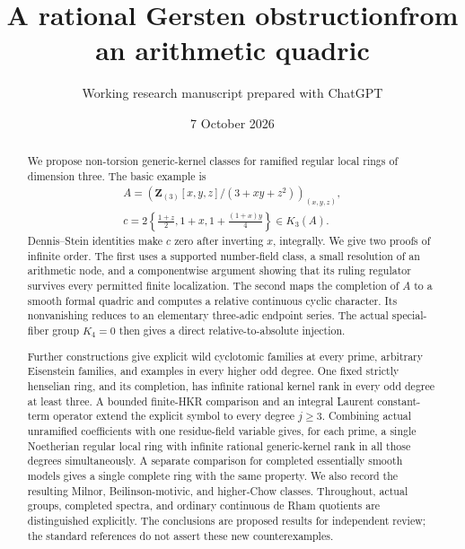 \documentclass[11pt,a4paper]{article}
\title{\textbf{A rational Gersten obstruction\newline from an arithmetic quadric}}
\author{Working research manuscript prepared with ChatGPT}
\date{7 October 2026}
\theoremstyle{remark}
\newcommand{\Z}{\mathbf Z}
\begin{document}
\maketitle
\thispagestyle{empty}

\begin{center}
\end{center}

\begin{abstract}
We propose non-torsion generic-kernel classes for ramified regular
local rings of dimension three. The basic example is
\[
 \begin{gathered}
 A=\left(\Z_{(3)}[x,y,z]/(3+xy+z^2)\right)_{(x,y,z)},\\
 c=2\left\{\frac{1+z}{2},1+x,1+\frac{(1+x)y}{4}\right\}\in K_3(A).
 \end{gathered}
\]
Dennis--Stein identities make $c$ zero after inverting $x$, integrally.
We give two proofs of infinite order. The first uses a supported
number-field class, a small resolution of an arithmetic node,
and a componentwise argument showing that its ruling regulator
survives every permitted finite localization. The second maps the
completion of $A$ to a smooth formal quadric and computes a relative
continuous cyclic character. Its nonvanishing reduces to an elementary
three-adic endpoint series. The actual special-fiber group $K_4=0$
then gives a direct relative-to-absolute injection.

Further constructions give explicit wild cyclotomic families at every
prime, arbitrary Eisenstein families, and examples in every higher odd
degree. One fixed strictly henselian ring, and its completion, has
infinite rational kernel rank in every odd degree at least three.
A bounded finite-HKR comparison and an integral Laurent constant-term
operator extend the explicit symbol to every degree $j\geq3$.
Combining actual unramified coefficients with one residue-field variable
gives, for each prime, a single Noetherian regular local ring with
infinite rational generic-kernel rank in all those degrees simultaneously.
A separate comparison for completed essentially smooth models gives
a single complete ring with the same property.
We also record the resulting Milnor, Beilinson-motivic, and higher-Chow
classes. Throughout, actual groups, completed spectra, and ordinary
continuous de Rham quotients are distinguished explicitly.
The conclusions are proposed results for independent review; the
standard references do not assert these new counterexamples.
\end{abstract}
\end{document}
